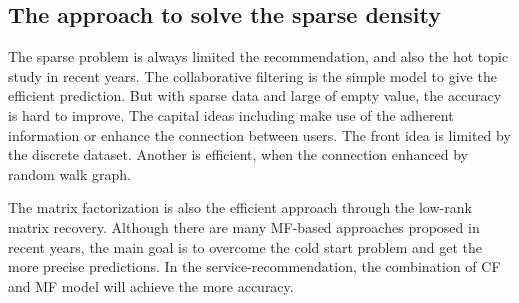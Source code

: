 \documentclass[conference]{IEEEtran}
\begin{document}
\subsection{The approach to solve the sparse density}
\par The sparse problem is always limited the recommendation, and also the hot topic study in recent years. The collaborative filtering is the simple model to give the efficient prediction. But with sparse data and large of empty value, the accuracy is hard to improve. The capital ideas including make use of the adherent information or enhance the connection between users. The front idea is limited by the discrete dataset. Another is efficient, when the connection enhanced by random walk graph. 
\par The matrix factorization is also the efficient approach through the low-rank matrix recovery\cite{choi_statistical_2015}\cite{agarwal_stochastic_2014}. Although there are many MF-based approaches\cite{zhou_qos-aware_2015}\cite{tran_low-rank_2016} proposed in recent years, the main goal is to overcome the cold start problem\cite{ongie_fast_2017} and get the more precise predictions. In the service-recommendation, the combination of CF and MF model\cite{koren_matrix_2009} will achieve the more accuracy.      
\end{document}
